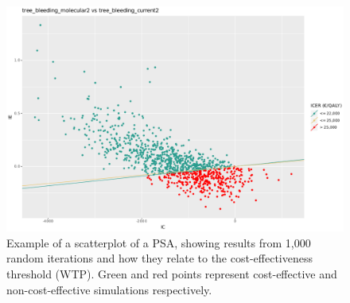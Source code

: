 \begin{figure}[h]
	\centering
	\includegraphics[width=\textwidth]{figures/endometrium_psa_scatterplot}
	\decoRule
	\caption[PSA scatterplot example]{Example of a scatterplot of a PSA, showing results from 1,000 random iterations and how they relate to the cost-effectiveness threshold (WTP). Green and red points represent cost-effective and non-cost-effective simulations respectively.}
	\label{fig:endometrium_psa_scatterplot}
\end{figure}
